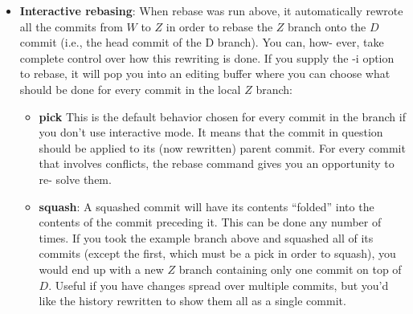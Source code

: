 \documentclass{report}
\begin{document}
\begin{itemize}
\begin{bashcode}
                git checkout Z 
                git rebase D # Change Z's base commit to point to D
            \end{bashcode}
            \bigbreak \noindent 
            Why is this only for local branches? Because every time you rebase, you’re potentially changing every commit in the branch. Earlier, when $W$ was based on $A$, it contained only the changes needed to transform $A$ into $W$. After running rebase, however, $W$ will be rewritten to contain the changes necessary to transform $D$ into $W^{\prime}$. Even the transformation from $W$ to $X$ is changed, because $A+W+X$ is now $D+W^{\prime}+X^{\prime}$ - and so on. If this were a branch whose changes are seen by other people, and any of your downstream consumers had created their own local branches off of $Z$, their branches would now point to the old $Z$, not the new $Z^{\prime}$
            \bigbreak \noindent 
            Generally, the following rule of thumb can be used: Use rebase if you have a local branch with no other branches that have branched off from it, and use merge for all other cases. Merge is also useful when you’re ready to pull your local branch’s changes back into the main branch.
        \item \textbf{Interactive rebasing}: When rebase was run above, it automatically rewrote all the commits from $W$ to $Z$ in order to rebase the $Z$ branch onto the $D$ commit (i.e., the head commit of the D branch). You can, how- ever, take complete control over how this rewriting is done. If you supply the -i option to rebase, it will pop you into an editing buffer where you can choose what should be done for every commit in the local $Z$ branch:
            \begin{itemize}
                \item \textbf{pick} This is the default behavior chosen for every commit in the branch if you don’t use interactive mode. It means that the commit in question should be applied to its (now rewritten) parent commit. For every commit that involves conflicts, the rebase command gives you an opportunity to re- solve them.
                \item \textbf{squash}: A squashed commit will have its contents “folded” into the contents of the commit preceding it. This can be done any number of times. If you took the example branch above and squashed all of its commits (except the first, which must be a pick in order to squash), you would end up with a new $Z$ branch containing only one commit on top of $D$. Useful if you have changes spread over multiple commits, but you’d like the history rewritten to show them all as a single commit.

\end{itemize}
\end{itemize}
\end{document}
